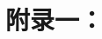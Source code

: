 \documentclass[10pt,a4paper,twoside]{article}
\numberwithin{figure}{section}%
\numberwithin{table}{section}%
\begin{document}







\newpage
\appendix%
\section*{附录一：}
\end{document}
